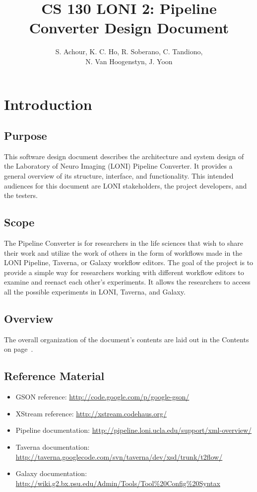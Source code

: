 \documentclass[12pt]{article}
\title{CS 130 LONI 2: Pipeline Converter Design Document}
\author{S. Achour, K. C. Ho, R. Soberano, C. Tandiono,\\ N. Van Hoogenstyn, J. Yoon}
\begin{document}
\maketitle
\pagebreak
\label{toc}
\tableofcontents
\pagebreak
\section{Introduction}
\subsection{Purpose}
This software design document describes the architecture and system design of the Laboratory of Neuro Imaging (LONI) Pipeline Converter. It provides a general overview of its structure, interface, and functionality. This intended audiences for this document are LONI stakeholders, the project developers, and the testers.

\subsection{Scope}

The Pipeline Converter is for researchers in the life sciences that wish to share their work and utilize the work of others in the form of workflows made in the LONI Pipeline, Taverna, or Galaxy workflow editors. The goal of the project is to provide a simple way for researchers working with different workflow editors to examine and reenact each other's experiments. It allows the researchers to access all the possible experiments in LONI, Taverna, and Galaxy.

\subsection{Overview}

The overall organization of the document's contents are laid out in the Contents on page~\pageref{toc}.

\subsection{Reference Material}
\begin{itemize}
\item GSON reference: \url{http://code.google.com/p/google-gson/}
\item XStream reference: \url{http://xstream.codehaus.org/}
\item Pipeline documentation: \url{http://pipeline.loni.ucla.edu/support/xml-overview/}
\item Taverna documentation: \url{http://taverna.googlecode.com/svn/taverna/dev/xsd/trunk/t2flow/}
\item Galaxy documentation: \url{http://wiki.g2.bx.psu.edu/Admin/Tools/Tool\%20Config\%20Syntax}
\end{itemize}
\end{document}
